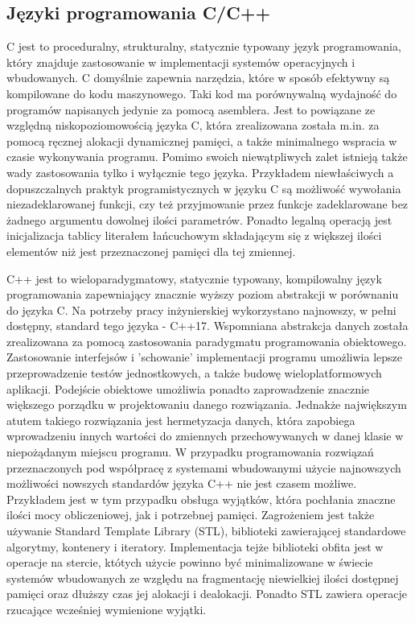 \subsection{Języki programowania C/C++} \label{sec:cpp}
C jest to proceduralny, strukturalny, statycznie typowany język programowania, który znajduje
zastosowanie w implementacji systemów operacyjnych i wbudowanych. C domyślnie zapewnia
narzędzia, które w sposób efektywny są kompilowane do kodu maszynowego. Taki kod ma porównywalną
wydajność do programów napisanych jedynie za pomocą asemblera. Jest to powiązane ze względną
niskopoziomowością języka C, która zrealizowana została m.in. za pomocą ręcznej alokacji
dynamicznej pamięci, a także minimalnego wspracia w czasie wykonywania programu. 
Pomimo swoich niewątpliwych zalet istnieją także wady zastosowania tylko i wyłącznie tego
języka. Przykładem niewłaściwych a dopuszczalnych praktyk programistycznych w języku C są
możliwość wywołania niezadeklarowanej funkcji, czy też przyjmowanie przez funkcje zadeklarowane
bez żadnego argumentu dowolnej ilości parametrów. Ponadto legalną operacją jest inicjalizacja
tablicy literałem łańcuchowym składającym się z większej ilości elementów niż jest przeznaczonej
pamięci dla tej zmiennej.

C++ jest to wieloparadygmatowy, statycznie typowany, kompilowalny język programowania zapewniający
znacznie wyższy poziom abstrakcji w porównaniu do języka C. Na potrzeby pracy inżynierskiej
wykorzystano najnowszy, w pełni dostępny, standard tego języka - C++17. 
Wspomniana abstrakcja danych została
zrealizowana za pomocą zastosowania paradygmatu programowania obiektowego. Zastosowanie interfejsów
i 'schowanie' implementacji programu umożliwia lepsze przeprowadzenie testów jednostkowych, a także
budowę wieloplatformowych aplikacji. Podejście obiektowe umożliwia ponadto zaprowadzenie znacznie
większego porządku w projektowaniu danego rozwiązania. Jednakże największym atutem takiego 
rozwiązania jest hermetyzacja danych, która zapobiega wprowadzeniu innych wartości do zmiennych
przechowywanych w danej klasie w niepożądanym miejscu programu.
W przypadku programowania rozwiązań przeznaczonych pod współpracę z systemami wbudowanymi użycie
najnowszych możliwości nowszych standardów języka C++ nie jest czasem możliwe. Przykładem jest
w tym przypadku obsługa wyjątków, która pochłania znaczne ilości mocy obliczeniowej, jak
i potrzebnej pamięci. Zagrożeniem jest także używanie Standard Template Library (STL), biblioteki
zawierającej standardowe algorytmy, kontenery i iteratory. Implementacja tejże biblioteki obfita
jest w operacje na stercie, któtych użycie powinno być minimalizowane w świecie systemów
wbudowanych ze względu na fragmentację niewielkiej ilości dostępnej pamięci oraz dłuższy czas
jej alokacji i dealokacji. Ponadto STL zawiera operacje rzucające wcześniej wymienione wyjątki. 

